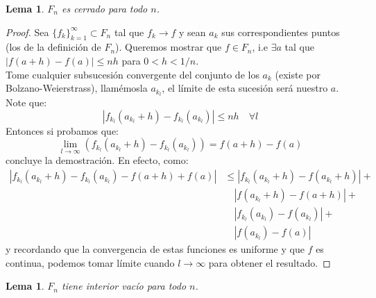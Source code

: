 \documentclass{article}
\newtheorem{lemma}[theorem]{Lema}
\theoremstyle{definition}
\newcommand{\suc}[4][\infty]{\{{#2_#3}\}_{#3=#4}^#1}
\begin{document}
\begin{lemma}
$F_n$ es cerrado para todo $n$.
\end{lemma}
\begin{proof}
Sea $\suc{f}{k}{1}\subset F_n$ tal que $f_k\rightarrow f$ y sean $a_k$ sus correspondientes puntos (los de la definición de $F_n$). Queremos mostrar que $f\in F_n$, i.e $\exists a$ tal que $|f(a+h)-f(a)|\leq nh$ para $0<h<1/n$.\\
Tome cualquier subsucesión convergente del conjunto de los $a_k$ (existe por Bolzano-Weierstrass), llamémosla $a_{k_l}$, el límite de esta sucesión será nuestro $a$. Note que:
$$
|f_{k_l}(a_{k_l}+h)-f_{k_l}(a_{k_l})|\leq nh\quad \forall l
$$
Entonces si probamos que:
$$
\lim_{l\rightarrow\infty}(f_{k_l}(a_{k_l}+h)-f_{k_l}(a_{k_l}))=f(a+h)-f(a)
$$
concluye la demostración. En efecto, como:\\
\begin{align*}
|f_{k_l}(a_{k_l}+h)-f_{k_l}(a_{k_l})-f(a+h)+f(a)|&\leq |f_{k_l}(a_{k_l}+h)-f(a_{k_l}+h)|+\\
&\quad |f(a_{k_l}+h)-f(a+h)|+\\
&\quad|f_{k_l}(a_{k_l})-f(a_{k_l})|+\\
&\quad |f(a_{k_l})-f(a)|
\end{align*}
y recordando que la convergencia de estas funciones es uniforme y que $f$ es continua, podemos tomar límite cuando $l\rightarrow\infty$ para obtener el resultado. 
\end{proof}
\begin{lemma}
$F_n$ tiene interior vacío para todo $n$.
\end{lemma}
\end{document}
